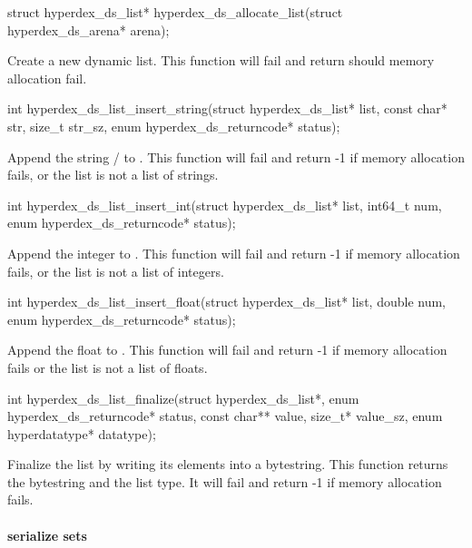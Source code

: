 \begin{ccode}
struct hyperdex_ds_list* hyperdex_ds_allocate_list(struct hyperdex_ds_arena* arena);
\end{ccode}
\funcdesc Create a new dynamic list.  This function will fail and return
 should memory allocation fail.

\funcsep
\begin{ccode}
int hyperdex_ds_list_insert_string(struct hyperdex_ds_list* list,
                                   const char* str, size_t str_sz,
                                   enum hyperdex_ds_returncode* status);
\end{ccode}
\funcdesc Append the string / to .  This
function will fail and return -1 if memory allocation fails, or the list is not
a list of strings.

\funcsep
\begin{ccode}
int hyperdex_ds_list_insert_int(struct hyperdex_ds_list* list, int64_t num,
                                enum hyperdex_ds_returncode* status);
\end{ccode}
\funcdesc Append the integer  to .  This function will fail
and return -1 if memory allocation fails, or the list is not a list of integers.

\funcsep
\begin{ccode}
int hyperdex_ds_list_insert_float(struct hyperdex_ds_list* list, double num,
                                  enum hyperdex_ds_returncode* status);
\end{ccode}
\funcdesc Append the float  to .  This function will fail
and return -1 if memory allocation fails or the list is not a list of floats.

\funcsep
\begin{ccode}
int hyperdex_ds_list_finalize(struct hyperdex_ds_list*,
                              enum hyperdex_ds_returncode* status,
                              const char** value, size_t* value_sz,
                              enum hyperdatatype* datatype);
\end{ccode}
\funcdesc Finalize the list by writing its elements into a bytestring.  This
function returns the bytestring and the list type.  It will fail and return -1
if memory allocation fails.

\paragraph{serialize sets}


